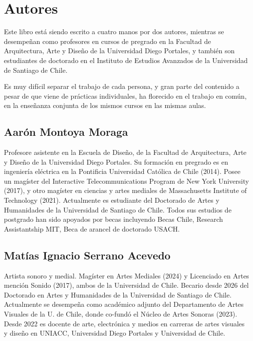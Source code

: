 \documentclass[../principal.tex]{subfiles}
\begin{document}
\chapter{Autores}

Este libro está siendo escrito a cuatro manos por dos autores, mientras se desempeñan como profesores en cursos de pregrado en la Facultad de Arquitectura, Arte y Diseño de la Universidad Diego Portales, y también son estudiantes de doctorado en el Instituto de Estudios Avanzados de la Universidad de Santiago de Chile.

Es muy difícil separar el trabajo de cada persona, y gran parte del contenido a pesar de que viene de prácticas individuales, ha florecido en el trabajo en común, en la enseñanza conjunta de los mismos cursos en las mismas aulas.

\section{Aarón Montoya Moraga}

Profesore asistente en la Escuela de Diseño, de la Facultad de Arquitectura, Arte y Diseño de la Universidad Diego Portales. Su formación en pregrado es en ingeniería eléctrica en la Pontificia Universidad Católica de Chile (2014). Posee un magíster del Interactive Telecommunications Program de New York University (2017), y otro magíster en ciencias y artes mediales de Massachusetts Institute of Technology (2021). Actualmente es estudiante del Doctorado de Artes y Humanidades de la Universidad de Santiago de Chile. Todos sus estudios de postgrado han sido apoyados por becas incluyendo Becas Chile, Research Assistantship MIT, Beca de arancel de doctorado USACH.

\section{Matías Ignacio Serrano Acevedo}

Artista sonoro y medial. Magíster en Artes Mediales (2024) y Licenciado en Artes mención Sonido (2017), ambos de la Universidad de Chile. Becario desde 2026 del Doctorado en Artes y Humanidades de la Universidad de Santiago de Chile. Actualmente se desempeña como académico adjunto del Departamento de Artes Visuales de la U. de Chile, donde co-fundó el Núcleo de Artes Sonoras (2023). Desde 2022 es docente de arte, electrónica y medios en carreras de artes visuales y diseño en UNIACC, Universidad Diego Portales y Universidad de Chile.

\newpage
\end{document}
